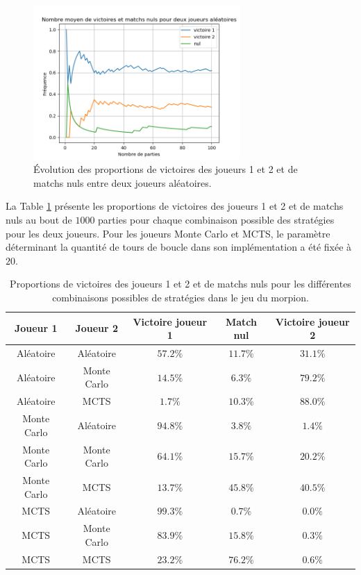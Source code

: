 \documentclass[a4paper,12pt]{article}
\begin{document}
\begin{figure}[ht]
\centering
\includegraphics[width=0.7\textwidth]{TicTacToe}
\caption{Évolution des proportions de victoires des joueurs 1 et 2 et de matchs nuls entre deux joueurs aléatoires.}
\label{FigMorpion}
\end{figure}

La Table \ref{TabMorpion} présente les proportions de victoires des joueurs 1 et 2 et de matchs nuls au bout de $1000$ parties pour chaque combinaison possible des stratégies pour les deux joueurs. Pour les joueurs Monte Carlo et MCTS, le paramètre \verb@n@ déterminant la quantité de tours de boucle dans son implémentation a été fixée à $20$.

\begin{table}[ht]
\centering
\begin{tabular}{cc|ccc}
\hline\hline
Joueur 1 & Joueur 2 & Victoire joueur 1 & Match nul & Victoire joueur 2 \tabularnewline
\hline
Aléatoire & Aléatoire &     $57.2\%$ & $11.7\%$ & $31.1\%$ \tabularnewline
Aléatoire & Monte Carlo &   $14.5\%$ & $6.3\%$ & $79.2\%$ \tabularnewline
Aléatoire & MCTS &          $1.7\%$ & $10.3\%$ & $88.0\%$ \tabularnewline
Monte Carlo & Aléatoire &   $94.8\%$ & $3.8\%$ & $1.4\%$ \tabularnewline
Monte Carlo & Monte Carlo & $64.1\%$ & $15.7\%$ & $20.2\%$ \tabularnewline
Monte Carlo & MCTS &        $13.7\%$ & $45.8\%$ & $40.5\%$ \tabularnewline
MCTS & Aléatoire &          $99.3\%$ & $0.7\%$ & $0.0\%$ \tabularnewline
MCTS & Monte Carlo &        $83.9\%$ & $15.8\%$ & $0.3\%$ \tabularnewline
MCTS & MCTS &               $23.2\%$ & $76.2\%$ & $0.6\%$ \tabularnewline
\hline\hline
\end{tabular}
\caption{Proportions de victoires des joueurs 1 et 2 et de matchs nuls pour les différentes combinaisons possibles de stratégies dans le jeu du morpion.}
\label{TabMorpion}
\end{table}
\end{document}
